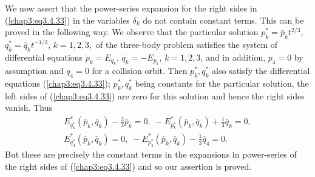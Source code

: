 We now assert that the power-series expansion for the right sides in
(\ref{chap3:eq3.4.33}) in the variables $\delta_k$ do not contain
constant terms. This can be proved in the following way. We observe
that the particular solution $p^*_k = \bar{p}_k t^{2/3}$, $q^*_k =
\bar{q}_k t^{-1/3}$, $k = 1,2,3,$ of the three-body problem satisfies
the system of differential equations $\dot{p}_k = E_{q_k}$, $\dot{q}_k
= - E_{p_k}$, $k =1,2,3$, and in addition, $p_4 = 0$ by assumption and
$q_4 = 0$ for a collision orbit. Then $p^*_k, q^*_k$ also satisfy the
differential equations (\ref{chap3:eq3.4.33}); $p^*_k, q^*_k$ being
constants for the particular solution, the left sides of
(\ref{chap3:eq3.4.33}) are zero for this solution and hence the right
sides vanish. Thus  
\begin{gather*}
E^*_{q^*_k} (\bar{p}_k, \bar{q}_k) - \frac{2}{3} \bar{p}_k  = 0, \; -
E^*_{p^*_k} (\bar{p}_k, \bar{q}_k) + \frac{1}{3} \bar{q}_k = 0,\\ 
E^*_{q^*_4} (\bar{p}_k, \bar{q}_k) = 0, \; - E^*_{p^*_4} (\bar{p}_k,
\bar{q}_k) - \frac{1}{3} \bar{q}_4 = 0. 
\end{gather*}
But these are precisely the constant terms in the expansions in
power-series of the right sides of (\ref{chap3:eq3.4.33}) and so our
assertion is proved. 

